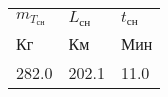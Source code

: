\begin{tabular}{lll}
$m_{T_{сн}}$ & $L_{сн}$ & $t_{сн}$ \\
Кг & Км & Мин \\
282.0 & 202.1 & 11.0 \\
\end{tabular}
